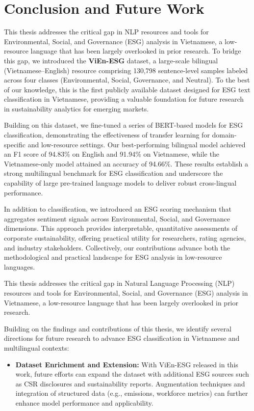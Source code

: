 \documentclass[12pt, letterpaper]{template}
\begin{document}
{{{\section{Conclusion and Future Work}\label{con}

This thesis addresses the critical gap in NLP resources and tools for Environmental, Social, and Governance (ESG) analysis in Vietnamese, a low-resource language that has been largely overlooked in prior research. To bridge this gap, we introduced the \textbf{ViEn-ESG} dataset, a large-scale bilingual (Vietnamese–English) resource comprising 130,798 sentence-level samples labeled across four classes (Environmental, Social, Governance, and Neutral). To the best of our knowledge, this is the first publicly available dataset designed for ESG text classification in Vietnamese, providing a valuable foundation for future research in sustainability analytics for emerging markets.

Building on this dataset, we fine-tuned a series of BERT-based models for ESG classification, demonstrating the effectiveness of transfer learning for domain-specific and low-resource settings. Our best-performing bilingual model achieved an F1 score of 94.83\% on English and 91.94\% on Vietnamese, while the Vietnamese-only model attained an accuracy of 94.66\%. These results establish a strong multilingual benchmark for ESG classification and underscore the capability of large pre-trained language models to deliver robust cross-lingual performance.

In addition to classification, we introduced an ESG scoring mechanism that aggregates sentiment signals across Environmental, Social, and Governance dimensions. This approach provides interpretable, quantitative assessments of corporate sustainability, offering practical utility for researchers, rating agencies, and industry stakeholders. Collectively, our contributions advance both the methodological and practical landscape for ESG analysis in low-resource languages.

This thesis addresses the critical gap in Natural Language Processing (NLP) resources and tools for Environmental, Social, and Governance (ESG) analysis in Vietnamese, a low-resource language that has been largely overlooked in prior research. 


Building on the findings and contributions of this thesis, we identify several directions for future research to advance ESG classification in Vietnamese and multilingual contexts:

\begin{itemize} 
    \item \textbf{Dataset Enrichment and Extension:} With ViEn-ESG released in this work, future efforts can expand the dataset with additional ESG sources such as CSR disclosures and sustainability reports. Augmentation techniques and integration of structured data (e.g., emissions, workforce metrics) can further enhance model performance and applicability.


\end{itemize}}}}
\end{document}
